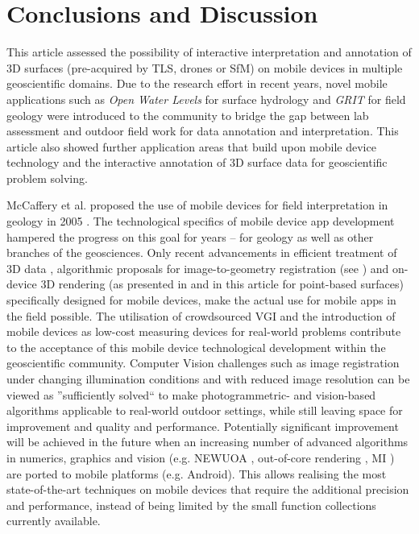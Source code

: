 \documentclass[review]{elsarticle}
\begin{document}
\section{Conclusions and Discussion}
\label{sec:conclusions}

This article assessed the possibility of interactive interpretation and annotation of 3D surfaces (pre-acquired by \gls{TLS}, drones or \gls{SfM}) on mobile devices in multiple geoscientific domains. Due to the research effort in recent years, novel mobile applications such as \textit{Open Water Levels} for surface hydrology and \textit{\gls{GRIT}} for field geology were introduced to the community to bridge the gap between lab assessment and outdoor field work for data annotation and interpretation. This article also showed further application areas that build upon mobile device technology and the interactive annotation of 3D surface data for geoscientific problem solving.

McCaffery et al. proposed the use of mobile devices for field interpretation in geology in 2005 \cite{McCaffrey2005}. The technological specifics of mobile device app development hampered the progress on this goal for years -- for geology as well as other branches of the geosciences. Only recent advancements in efficient treatment of 3D data \cite{Kroehnert2017b}, algorithmic proposals for image-to-geometry registration (see \citep{Gauglitz2014,Kehl2017_VGC}) and on-device 3D rendering (as presented in \cite{Agus2017} and in this article for point-based surfaces) specifically designed for mobile devices, make the actual use for mobile apps in the field possible. The utilisation of crowdsourced \gls{VGI} and the introduction of mobile devices as low-cost measuring devices for real-world problems \cite{Eltner2017} contribute to the acceptance of this mobile device technological development within the geoscientific community. Computer Vision challenges such as image registration under changing illumination conditions and with reduced image resolution can be viewed as ''sufficiently solved`` to make photogrammetric- and vision-based algorithms applicable to real-world outdoor settings, while still leaving space for improvement and quality and performance. Potentially significant improvement will be achieved in the future when an increasing number of advanced algorithms in numerics, graphics and vision (e.g. NEWUOA \cite{Powell2006}, out-of-core rendering \cite{Borgeat2005}, \gls{MI} \cite{Viola1997}) are ported to mobile platforms (e.g. Android). This allows realising the most state-of-the-art techniques on mobile devices that require the additional precision and performance, instead of being limited by the small function collections currently available.
\end{document}
